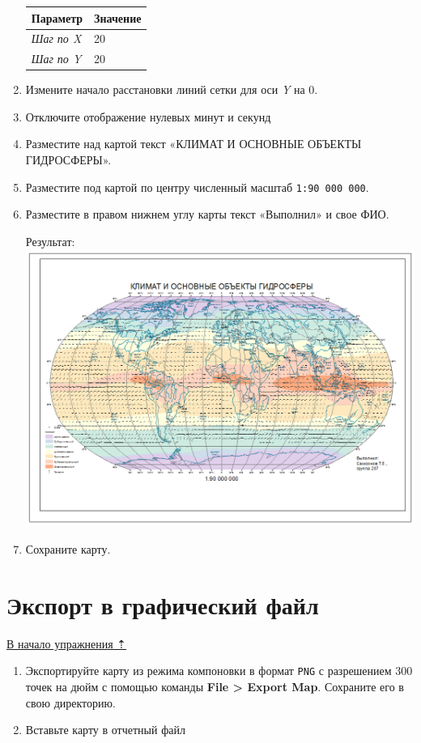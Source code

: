\documentclass[]{book}
\theoremstyle{definition}
\theoremstyle{definition}
\theoremstyle{definition}
\theoremstyle{remark}
\begin{document}
\begin{enumerate}
  \begin{longtable}[]{@{}ll@{}}
  \toprule
  \textbf{Параметр} & \textbf{Значение}\tabularnewline
  \midrule
  \endhead
  \emph{Шаг по X} & 20\tabularnewline
  \emph{Шаг по Y} & 20\tabularnewline
  \bottomrule
  \end{longtable}
\item
  Измените начало расстановки линий сетки для оси \emph{Y} на 0.
\item
  Отключите отображение нулевых минут и секунд
\item
  Разместите над картой текст «КЛИМАТ И ОСНОВНЫЕ ОБЪЕКТЫ ГИДРОСФЕРЫ».
\item
  Разместите под картой по центру численный масштаб
  \texttt{1:90\ 000\ 000}.
\item
  Разместите в правом нижнем углу карты текст «Выполнил» и свое ФИО.

  Результат: \includegraphics{images/Ex01/image35.png}
\item
  Сохраните карту.
\end{enumerate}

\hypertarget{map-design-climates-export}{%
\section{Экспорт в графический файл}\label{map-design-climates-export}}

\protect\hyperlink{map-design-climates}{В начало упражнения ⇡}

\begin{enumerate}
\def\labelenumi{\arabic{enumi}.}
\item
  Экспортируйте карту из режима компоновки в формат \texttt{PNG} с
  разрешением 300 точек на дюйм с помощью команды \textbf{File
  \textgreater{} Export Map}. Сохраните его в свою директорию.
\item
  Вставьте карту в отчетный файл
\end{enumerate}
\end{document}
